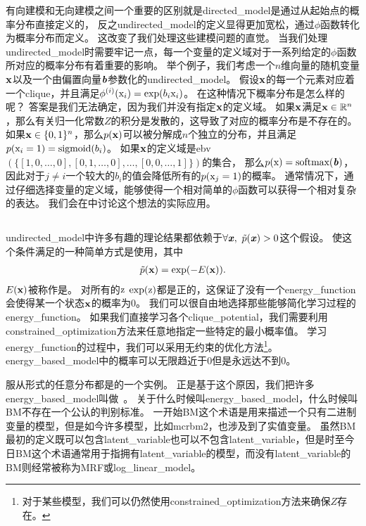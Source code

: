 有向建模和无向建模之间一个重要的区别就是\gls{directed_model}是通过从起始点的概率分布直接定义的，
反之\gls{undirected_model}的定义显得更加宽松，通过$\phi$函数转化为概率分布而定义。
这改变了我们处理这些建模问题的直觉。
当我们处理\gls{undirected_model}时需要牢记一点，每一个变量的定义域对于一系列给定的$\phi$函数所对应的概率分布有着重要的影响。
举个例子，我们考虑一个$n$维向量的随机变量$\mathbf{x}$以及一个由偏置向量$\boldsymbol{\mathit{b}}$参数化的\gls{undirected_model}。
假设$\mathbf{x}$的每一个元素对应着一个\gls{clique}，并且满足$\phi^{(i)}(\mathrm{x}_i) = \exp(b_i\mathrm{x}_i)$。
在这种情况下概率分布是怎么样的呢？
答案是我们无法确定，因为我们并没有指定$\mathbf{x}$的定义域。
如果$\mathbf{x}$满足$\mathbf{x} \in \mathbb{R}^n$，那么有关归一化常数$Z$的积分是发散的，这导致了对应的概率分布是不存在的。
如果$\mathbf{x}\in\{0,1\}^n$，那么$p(\mathbf{x})$可以被分解成$n$个独立的分布，并且满足$p(\mathrm{x}_i=1) = \text{sigmoid}(b_i)$。
如果$\mathbf{x}$的定义域是\gls{ebv} $(\{[1,0,\ldots,0],[0,1,\ldots,0],\ldots,[0,0,\ldots,1]\})$的集合，
那么$p(\mathrm{x}) = \text{softmax}(\boldsymbol{\mathit{b}})$，因此对于$j\neq i$一个较大的$b_i$的值会降低所有的$p(\mathrm{x}_j = 1)$的概率。
通常情况下，通过仔细选择变量的定义域，能够使得一个相对简单的$\phi$函数可以获得一个相对复杂的表达。
我们会在中讨论这个想法的实际应用。


\subsection{}
\label{sec:energy_based_models}


\gls{undirected_model}中许多有趣的理论结果都依赖于$\forall \boldsymbol{\mathit{x}},\ \tilde{p}(\boldsymbol{\mathit{x}})>0$这个假设。
使这个条件满足的一种简单方式是使用，其中
\begin{align}
\label{eqn:167}
\tilde{p}(\mathbf{x}) = \exp(-E(\mathbf{x})).
\end{align}
$E(\mathbf{x})$被称作是。
对所有的$\mathrm{z}$ $\exp(\mathrm{z})$都是正的，这保证了没有一个\gls{energy_function}会使得某一个状态$\mathbf{x}$的概率为$0$。
我们可以很自由地选择那些能够简化学习过程的\gls{energy_function}。
如果我们直接学习各个\gls{clique_potential}，我们需要利用\gls{constrained_optimization}方法来任意地指定一些特定的最小概率值。
学习\gls{energy_function}的过程中，我们可以采用无约束的优化方法\footnote{对于某些模型，我们可以仍然使用\gls{constrained_optimization}方法来确保$Z$存在。}。
\gls{energy_based_model}中的概率可以无限趋近于$0$但是永远达不到$0$。


服从形式的任意分布都是的一个实例。
正是基于这个原因，我们把许多\gls{energy_based_model}叫做~\citep{Fahlman83,Ackley85,Hinton84,Hinton86a}。
关于什么时候叫\gls{energy_based_model}，什么时候叫\gls{BM}不存在一个公认的判别标准。
一开始\gls{BM}这个术语是用来描述一个只有二进制变量的模型，但是如今许多模型，比如\gls{mcrbm2}，也涉及到了实值变量。
虽然\gls{BM}最初的定义既可以包含\gls{latent_variable}也可以不包含\gls{latent_variable}，但是时至今日\gls{BM}这个术语通常用于指拥有\gls{latent_variable}的模型，而没有\gls{latent_variable}的\gls{BM}则经常被称为\gls{MRF}或\gls{log_linear_model}。



